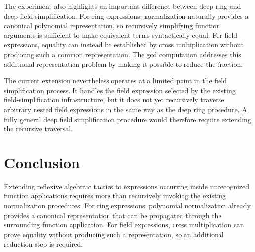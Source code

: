 \documentclass[11pt]{article}
\begin{document}
The experiment also highlights an important difference between deep ring and
deep field simplification. For ring expressions, normalization naturally
provides a canonical polynomial representation, so recursively simplifying
function arguments is sufficient to make equivalent terms syntactically
equal. For field expressions, equality can instead be established by cross
multiplication without producing such a common representation. The gcd
computation addresses this additional representation problem by making it possible to reduce the fraction.

The current extension nevertheless operates at a limited point in the field
simplification process. It handles the field expression selected by the
existing field-simplification infrastructure, but it does not yet recursively
traverse arbitrary nested field expressions in the same way as the deep ring
procedure. A fully general deep field simplification procedure would therefore
require extending the recursive traversal.





\section{Conclusion}

Extending reflexive algebraic tactics to expressions occurring inside
unrecognized function applications requires more than recursively invoking
the existing normalization procedures. For ring expressions, polynomial
normalization already provides a canonical representation that can be
propagated through the surrounding function application. For field
expressions, cross multiplication can prove equality without producing such a
representation, so an additional reduction step is required.
\end{document}
